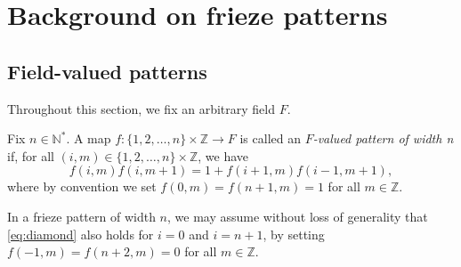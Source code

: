 \chapter{Background on frieze patterns}\label{s:fp}
\section{Field-valued patterns}
Throughout this section, we fix an arbitrary field $F$. 


\begin{definition}
    \label{def:pattern_n}
        Fix $n \in \mathbb{N}^*$. A map $f : \{1,2,\ldots , n\} \times \mathbb{Z} \longrightarrow F$ is called
        an \textit{$F$-valued pattern of width n} if, for all $(i,m) \in \{1,2,\ldots , n\} \times \mathbb{Z}$, we have
        \begin{equation}\label{eq:diamond}
            f(i,m) f(i,m+1) = 1 + f(i+1,m) f(i-1, m+1),
        \end{equation}
        where by convention we set $f(0,m) = f(n+1,m) = 1$ for all $m \in \mathbb{Z}$. 
    \end{definition}
    In a frieze pattern of width $n$, we may assume without loss of generality that \eqref{eq:diamond} also holds for 
    $i=0$ and $i = n+1$, by setting $f(-1,m) = f(n+2,m) = 0$ for all $m \in \mathbb{Z}$. 


